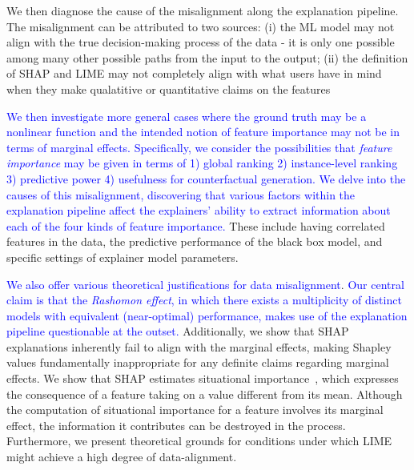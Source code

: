 \documentclass[mnsc,blindrev]{informs3}
\begin{document}
We then diagnose the cause of the misalignment along the explanation pipeline. The misalignment can be attributed to two sources: (i) the ML model may not align with the true decision-making process of the data - it is only one possible among many other possible paths from the input to the output; (ii) the definition of SHAP and LIME may not completely align with what users have in mind when they make qualatitive or quantitative claims on the features


\textcolor{blue}{We then investigate more general cases where the ground truth may be a nonlinear function and the intended notion of feature importance may not be in terms of marginal effects. Specifically, we consider the possibilities that \emph{feature importance} may be given in terms of 1) global ranking 2) instance-level ranking 3) predictive power 4) usefulness for counterfactual generation. We delve into the causes of this misalignment, discovering that various factors within the explanation pipeline affect the explainers' ability to extract information about each of the four kinds of feature importance.} These include having correlated features in the data, the predictive performance of the black box model, and specific settings of explainer model parameters. %

\textcolor{blue}{We also offer various theoretical justifications for data misalignment}.
\textcolor{blue}{Our central claim is that the \emph{Rashomon effect}, in which there exists a multiplicity of distinct models with equivalent (near-optimal) performance, makes use of the explanation pipeline questionable at the outset.} Additionally, we show that SHAP explanations inherently fail to align with the marginal effects, making Shapley values fundamentally inappropriate for any definite claims regarding marginal effects. We show that SHAP estimates situational importance~\citep{StrumbeljErik2014Epma}, 
 which expresses the consequence of a feature taking on a value different from its mean. Although the computation of situational importance for a feature involves its marginal effect, the information it contributes can be destroyed in the process. Furthermore, we present theoretical grounds for conditions under which LIME might achieve a high degree of data-alignment.

\end{document}
